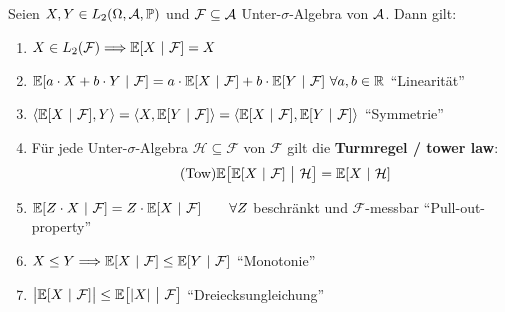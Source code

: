 \begin{proposition}\enter\label{Prop1.4}
	Seien $X,Y\in L_2(\Omega,\mathcal{A},\mathbb{P})$ und $\mathcal{F}\subseteq\mathcal{A}$ Unter-$\sigma$-Algebra von $\mathcal{A}$. Dann gilt:
	\begin{enumerate}[label=(\alph*)]
		\item $X\in L_2(\mathcal{F})\Longrightarrow\mathbb{E}[X~|~\mathcal{F}]=X$
		\item $\mathbb{E}[a\cdot X+b\cdot Y~|~\mathcal{F}]=a\cdot\mathbb{E}[X~|~\mathcal{F}]+b\cdot\mathbb{E}[Y~|~\mathcal{F}]~\forall a,b\in\mathbb{R}$ ``Linearität''
		\item $\langle\mathbb{E}[X~|~\mathcal{F}],Y\rangle
		=\langle X,\mathbb{E}[Y~|~\mathcal{F}]\rangle
		=\langle\mathbb{E}[X~|~\mathcal{F}],\mathbb{E}[Y~|~\mathcal{F}]\rangle$ ``Symmetrie''
		\item Für jede Unter-$\sigma$-Algebra $\mathcal{H}\subseteq\mathcal{F}$ von $\mathcal{F}$ gilt die \textbf{Turmregel / tower law}:
		\begin{align}\label{Turmregel}\tag{Tow}
			\mathbb{E}\big[\mathbb{E}[X~|~\mathcal{F}]~\big|~\mathcal{H}\big]=\mathbb{E}[X~|~\mathcal{H}]
		\end{align}
		\item $\mathbb{E}[Z\cdot X~|~\mathcal{F}]=Z\cdot\mathbb{E}[X~|~\mathcal{F}]\qquad\forall Z$ beschränkt und $\mathcal{F}$-messbar ``Pull-out-property''
		\item $X\leq Y\Longrightarrow\mathbb{E}[X~|~\mathcal{F}]\leq\mathbb{E}[Y~|~\mathcal{F}]$ ``Monotonie''
		\item $\big|\mathbb{E}[X~|~\mathcal{F}]\big|\leq\mathbb{E}\big[|X|~\big|~\mathcal{F}\big]$ ``Dreiecksungleichung''
	\end{enumerate}
\end{proposition}


